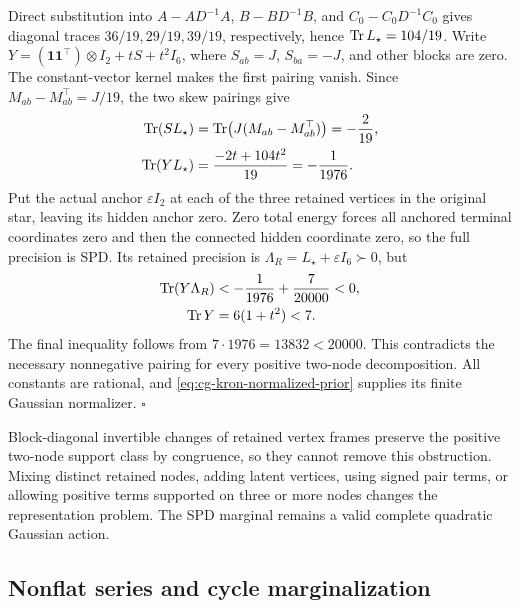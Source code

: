 Direct substitution into \(A-AD^{-1}A\), \(B-BD^{-1}B\), and
\(C_0-C_0D^{-1}C_0\) gives diagonal traces
\(36/19,29/19,39/19\), respectively, hence
\(\operatorname{Tr} L_\star=104/19\).
Write \(Y=(\mathbf1\mathbf1^\top)\otimes I_2+tS+t^2I_6\),
where \(S_{ab}=J\), \(S_{ba}=-J\), and other blocks are zero.
The constant-vector kernel makes the first pairing vanish.
Since \(M_{ab}-M_{ab}^\top=J/19\), the two skew pairings give
\begin{equation}
\begin{aligned}
\operatorname{Tr}(SL_\star)
&=\operatorname{Tr}\bigl(J(M_{ab}-M_{ab}^\top)\bigr)=-\frac2{19},\\
\operatorname{Tr}(YL_\star)
&=\frac{-2t+104t^2}{19}=-\frac1{1976}.
\end{aligned}
\label{eq:cg-kron-negative-dual-pairing}
\end{equation}
Put the actual anchor \(\varepsilon I_2\) at each of the three
retained vertices in the original star, leaving its hidden anchor
zero. Zero total energy forces all anchored terminal coordinates
zero and then the connected hidden coordinate zero, so the full
precision is SPD. Its retained precision is
\(\Lambda_R=L_\star+\varepsilon I_6\succ0\), but
\begin{equation}
\begin{aligned}
\operatorname{Tr}(Y\Lambda_R)&<-\frac1{1976}+\frac7{20000}<0,\\
\operatorname{Tr} Y&=6(1+t^2)<7.
\end{aligned}
\label{eq:cg-kron-proper-dual-obstruction}
\end{equation}
The final inequality follows from \(7\cdot1976=13832<20000\).
This contradicts the necessary nonnegative pairing for every
positive two-node decomposition. All constants are rational,
and \eqref{eq:cg-kron-normalized-prior} supplies its finite
Gaussian normalizer. \(\square\)

Block-diagonal invertible changes of retained vertex frames preserve the
positive two-node support class by congruence, so they cannot remove
this obstruction. Mixing distinct retained nodes, adding latent
vertices, using signed pair terms, or allowing positive terms
supported on three or more nodes changes the representation
problem. The SPD marginal remains a valid complete quadratic
Gaussian action. 

\subsection{Nonflat series and cycle marginalization}
\label{sec:cg-nonflat-series-kron}

